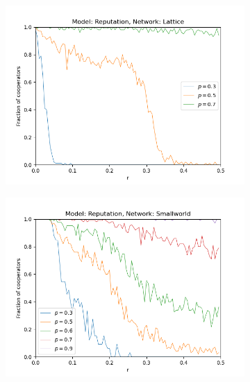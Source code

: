 \documentclass[11pt, A4 paper, twocolumn ]{article}
\begin{document}
\begin{figure}[p]
\begin{subfigure}[b]{0.3\textwidth}
	\includegraphics[width=\textwidth]{graphs/fc_r_varyingp_lattice}
	\caption{}
	\label{fig:lat-rep}
\end{subfigure}
\begin{subfigure}[b]{0.3\textwidth}
	\centering
	\includegraphics[width=\textwidth]{graphs/fc_r_varyingp_smallworld}
	\caption{}
	\label{fig:sw-rep}
\end{subfigure}
\begin{subfigure}[b]{0.3\textwidth}
	\centering

\end{subfigure}
\end{figure}
\end{document}
